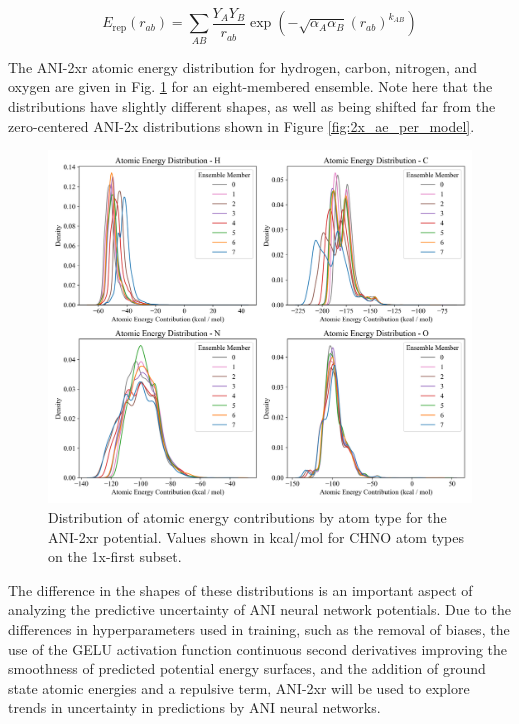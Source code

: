 \begin{equation}
\label{eq:repulsion}
    E_{\text{rep}}(r_{ab}) = 
    \sum_{AB}\frac{{Y_{A} Y_{B}}}{r_{ab}}
    \exp \left( -\sqrt{\alpha_{A} \alpha_{B}} {(r_{ab})}^{k_{AB}} \right)
\end{equation}

The ANI-2xr atomic energy distribution for hydrogen, carbon, nitrogen, and oxygen are given in Fig. \ref{fig:2xr_ae_per_model} for an eight-membered ensemble.
Note here that the distributions have slightly different shapes, as well as being shifted far from the zero-centered ANI-2x distributions shown in Figure \ref{fig:2x_ae_per_model}.

\begin{figure}[H]
    \centering
    \includegraphics[width=1\linewidth]{Images/2xr_outputs/2xr_1x-first_ae-per-model.png}
    \caption[Atomic energies predicted by ANI-2xr]{Distribution of atomic energy contributions by atom type for the ANI-2xr potential. Values shown in kcal/mol for CHNO atom types on the 1x-first subset.}
    \label{fig:2xr_ae_per_model}
\end{figure}

The difference in the shapes of these distributions is an important aspect of analyzing the predictive uncertainty of ANI neural network potentials.
Due to the differences in hyperparameters used in training, such as the removal of biases, the use of the GELU activation function \cite{gelu} continuous second derivatives improving the smoothness of predicted potential energy surfaces, and the addition of ground state atomic energies and a repulsive term, ANI-2xr will be used to explore trends in uncertainty in predictions by ANI neural networks. 

